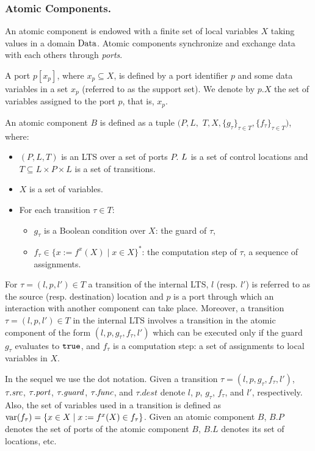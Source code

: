 \subsubsection{Atomic Components.}
%
An atomic component is endowed with a finite set of local variables $X$ taking values in a domain $\mathit{\Data}$. Atomic components synchronize and exchange data with each others through \emph{ports}.
%
\begin{definition}[Port]
A port $p[x_p]$, where $x_p\subseteq X$, is defined by a port identifier $p$ and some data variables in a set $x_p$ (referred to as the support set). We denote by $p.X$ the set of variables assigned to the port $p$, that is, $x_p$.
\end{definition}
%
%
\begin{definition}
An atomic component $B$ is defined as a tuple $(P,L,$ $T,X,\{g_\tau\}_{\tau \in T}, \{f_{ \tau}\}_{\tau \in T})$, 
where:
\begin{itemize}
\item $(P,L,T)$ is an LTS over a set of ports $P$. $L\ignore{=\{l_1,l_2,\ldots,l_k\}}$ is a set of control locations and $T \subseteq L \times P \times L$ is a set of transitions.
\item $X$ is a set of variables.
\item For each transition $\tau \in T$: 
\begin{itemize}
\item $g_{\tau}$ is a Boolean condition over $X$: the guard of $\tau$,
\item $f_\tau\in \{x := f^x(X)\mid x\in X\}^*$: the computation step of $\tau$, a sequence of assignments.
\end{itemize}
\end{itemize}
\end{definition}
%
For $\tau = (l,p,l')\in T$ a transition of the internal LTS, $l$ (resp. $l'$) is referred to as the source (resp.
destination) location and $p$ is a port through which an interaction with another component can take place. Moreover, a transition $\tau = (l,p,l')\in T$ in the internal LTS involves a transition in the atomic component of the form $(l,p,g_\tau,f_\tau,l')$ which can be executed only if the guard $g_\tau$ evaluates to $\true$, and $f_\tau$ is a computation step: a set of assignments to local variables in $X$.

In the sequel we use the dot notation.
Given a transition $\tau = (l,p,g_\tau,f_\tau,l')$, $\tau.\source$, $\tau.\port$, $\tau.\guard$, $\tau.\func$, and $\tau.dest$ denote $l$, $p$, $g_\tau$, $f_\tau$, and $l'$, respectively.
Also, the set of variables used in a transition is defined as $\var(f_\tau) = \{x \in X \mid x:= f^x(X) \in f_\tau\}$.
Given an atomic component $B$, $B.P$ denotes the set of ports of the atomic component $B$, $B.L$ denotes its set of locations, etc.

